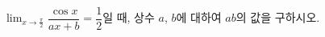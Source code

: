 $\displaystyle\lim_{x\to\frac{\pi}{2}}\dfrac{\cos x}{ax+b}=\dfrac{1}{2}$일 때, 상수 $a$, $b$에 대하여 $ab$의 값을 구하시오.
